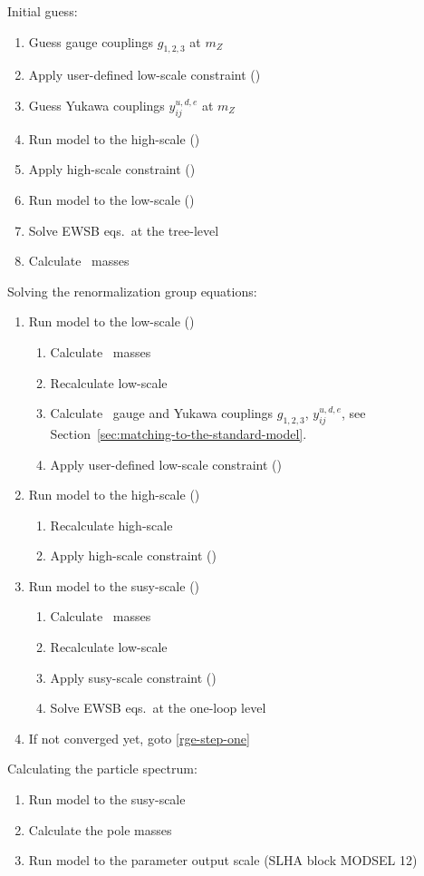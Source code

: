 Initial guess:
\begin{enumerate}
\item Guess gauge couplings $g_{1,2,3}$ at $m_Z$
\item Apply user-defined low-scale constraint ()
\item Guess Yukawa couplings $y^{u,d,e}_{ij}$ at $m_Z$
\item Run model to the high-scale ()
\item Apply high-scale constraint ()
\item Run model to the low-scale ()
\item Solve EWSB eqs.\ at the tree-level
\item Calculate \DRbar\ masses
\end{enumerate}
%
Solving the renormalization group equations:
\begin{enumerate}
\item \label{rge-step-one} Run model to the low-scale ()
  \begin{enumerate}
  \item Calculate \DRbar\ masses
  \item Recalculate low-scale
  \item Calculate \DRbar\ gauge and Yukawa couplings $g_{1,2,3}$,
    $y^{u,d,e}_{ij}$, see
    Section~\ref{sec:matching-to-the-standard-model}.
  \item Apply user-defined low-scale constraint ()
  \end{enumerate}
\item Run model to the high-scale ()
  \begin{enumerate}
  \item Recalculate high-scale
  \item Apply high-scale constraint ()
  \end{enumerate}
\item Run model to the susy-scale ()
  \begin{enumerate}
  \item Calculate \DRbar\ masses
  \item Recalculate low-scale
  \item Apply susy-scale constraint ()
  \item Solve EWSB eqs.\ at the one-loop level
  \end{enumerate}
\item If not converged yet, goto \ref{rge-step-one}
\end{enumerate}
%
Calculating the particle spectrum:
\begin{enumerate}
\item Run model to the susy-scale
\item Calculate the pole masses
\item Run model to the parameter output scale (SLHA block MODSEL 12)
\end{enumerate}

